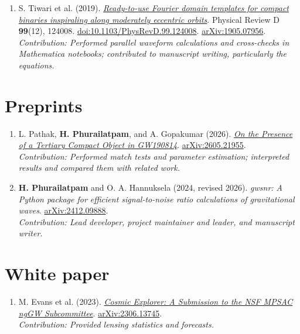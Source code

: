 \documentclass[11pt]{article}
\begin{document}
\begin{enumerate}
\item S. Tiwari et al. (2019). \href{https://doi.org/10.1103/PhysRevD.99.124008}{\textit{Ready-to-use Fourier domain templates for compact binaries inspiraling along moderately eccentric orbits}}. Physical Review D \textbf{99}(12), 124008. \href{https://doi.org/10.1103/PhysRevD.99.124008}{doi:10.1103/PhysRevD.99.124008}. \href{https://arxiv.org/abs/1905.07956}{arXiv:1905.07956}.\\\emph{Contribution: Performed parallel waveform calculations and cross-checks in Mathematica notebooks; contributed to manuscript writing, particularly the equations.}
\end{enumerate}

\section*{Preprints}
\begin{enumerate}[start=11]
\item L. Pathak, \textbf{H. Phurailatpam}, and A. Gopakumar (2026). \href{https://arxiv.org/abs/2605.21955}{\textit{On the Presence of a Tertiary Compact Object in GW190814}}. \href{https://arxiv.org/abs/2605.21955}{arXiv:2605.21955}.\\\emph{Contribution: Performed match tests and parameter estimation; interpreted results and compared them with related work.}
\item \textbf{H. Phurailatpam} and O. A. Hannuksela (2024, revised 2026). \textit{gwsnr: A Python package for efficient signal-to-noise ratio calculations of gravitational waves}. \href{https://arxiv.org/abs/2412.09888}{arXiv:2412.09888}.\\\emph{Contribution: Lead developer, project maintainer and leader, and manuscript writer.}
\end{enumerate}

\section*{White paper}
\begin{enumerate}[start=13]
\item M. Evans et al. (2023). \href{https://arxiv.org/abs/2306.13745}{\textit{Cosmic Explorer: A Submission to the NSF MPSAC ngGW Subcommittee}}. \href{https://arxiv.org/abs/2306.13745}{arXiv:2306.13745}.\\\emph{Contribution: Provided lensing statistics and forecasts.}
\end{enumerate}
\end{document}
